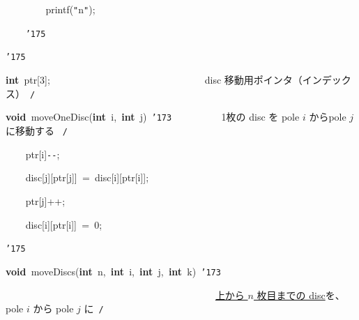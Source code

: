 \documentclass[a4paper,10pt]{article}
\def\mc{\relax}
\begin{document}
\noindent
\mbox{}{\tt\mc \ }{\tt\mc \ }{\tt\mc \ }{\tt\mc \ }{\tt\mc \ }{\tt\mc \ }{\tt\mc \ }{\tt\mc \ }printf({\tt "}{\tt{}}n{\tt "});

\noindent
\mbox{}{\tt\mc \ }{\tt\mc \ }{\tt\mc \ }{\tt\mc \ }{\tt\char'175}

\noindent
\mbox{}{\tt\char'175}

\noindent
\mbox{}\hfill

\noindent
\mbox{}\textbf{int}{\tt\mc \ }ptr[3];{\tt\mc \ }{\tt\mc \ }{\tt\mc \ }{\tt\mc \ }{\tt\mc \ }{\tt\mc \ }{\tt\mc \ }{\tt\mc \ }{\tt\mc \ }{\tt\mc \ }{\tt\mc \ }{\tt\mc \ }{\tt\mc \ }{\tt\mc \ }{\tt\mc \ }{\tt\mc \ }{\tt\mc \ }{\tt\mc \ }{\tt\mc \ }{\tt\mc \ }{\tt\mc \ }{\tt\mc \ }{\tt\mc \ }{\tt\mc \ }{\tt\mc \ }{\tt\mc \ }{\tt\mc \ }{\tt\mc \ }{\tt\mc \ }\rm\mc {\tt /}{\tt *}\  \ disc 移動用ポインタ（インデックス）\hfill \rm\mc \ {\tt *}{\tt /}
\tt\mc 

\noindent
\mbox{}\hfill

\noindent
\mbox{}\textbf{void}{\tt\mc \ }moveOneDisc(\textbf{int}{\tt\mc \ }i,{\tt\mc \ }\textbf{int}{\tt\mc \ }j){\tt\mc \ }{\tt\char'173}{\tt\mc \ }{\tt\mc \ }{\tt\mc \ }{\tt\mc \ }{\tt\mc \ }{\tt\mc \ }{\tt\mc \ }{\tt\mc \ }\rm\mc {\tt /}{\tt *}\  \ 1枚の disc を pole $i$ からpole $j$ に移動する \hfill \rm\mc \ {\tt *}{\tt /}
\tt\mc 

\noindent
\mbox{}{\tt\mc \ }{\tt\mc \ }{\tt\mc \ }{\tt\mc \ }ptr[i]{\tt -}{\tt -};

\noindent
\mbox{}{\tt\mc \ }{\tt\mc \ }{\tt\mc \ }{\tt\mc \ }disc[j][ptr[j]]{\tt\mc \ }={\tt\mc \ }disc[i][ptr[i]];

\noindent
\mbox{}{\tt\mc \ }{\tt\mc \ }{\tt\mc \ }{\tt\mc \ }ptr[j]++;

\noindent
\mbox{}{\tt\mc \ }{\tt\mc \ }{\tt\mc \ }{\tt\mc \ }disc[i][ptr[i]]{\tt\mc \ }={\tt\mc \ }0;

\noindent
\mbox{}{\tt\char'175}

\noindent
\mbox{}\hfill

\noindent
\mbox{}\textbf{void}{\tt\mc \ }moveDiscs(\textbf{int}{\tt\mc \ }n,{\tt\mc \ }\textbf{int}{\tt\mc \ }i,{\tt\mc \ }\textbf{int}{\tt\mc \ }j,{\tt\mc \ }\textbf{int}{\tt\mc \ }k){\tt\mc \ }{\tt\char'173}

\noindent
\mbox{}{\tt\mc \ }{\tt\mc \ }{\tt\mc \ }{\tt\mc \ }{\tt\mc \ }{\tt\mc \ }{\tt\mc \ }{\tt\mc \ }{\tt\mc \ }{\tt\mc \ }{\tt\mc \ }{\tt\mc \ }{\tt\mc \ }{\tt\mc \ }{\tt\mc \ }{\tt\mc \ }{\tt\mc \ }{\tt\mc \ }{\tt\mc \ }{\tt\mc \ }{\tt\mc \ }{\tt\mc \ }{\tt\mc \ }{\tt\mc \ }{\tt\mc \ }{\tt\mc \ }{\tt\mc \ }{\tt\mc \ }{\tt\mc \ }{\tt\mc \ }{\tt\mc \ }{\tt\mc \ }{\tt\mc \ }{\tt\mc \ }{\tt\mc \ }{\tt\mc \ }{\tt\mc \ }{\tt\mc \ }{\tt\mc \ }{\tt\mc \ }\rm\mc {\tt /}{\tt *}\  \ \underline{\textsf{上から $n$ 枚目までの disc}}を、pole $i$ から pole $j$ に\hfill \rm\mc \ {\tt *}{\tt /}
\tt\mc 
\end{document}
